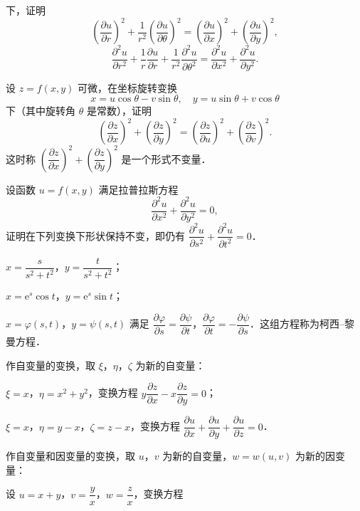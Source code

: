 \begin{xiti}
\[\]
下，证明
\[
\left(\frac{\partial u}{\partial r}\right)^{2}+\frac{1}{r^{2}}\left(\frac{\partial u}{\partial\theta}\right)^{2}=\left(\frac{\partial u}{\partial x}\right)^{2}+\left(\frac{\partial u}{\partial y}\right)^{2},
\]
\[
\frac{\partial^{2}u}{\partial r^{2}}+\frac{1}{r}\frac{\partial u}{\partial r}+\frac{1}{r^{2}}\frac{\partial^{2}u}{\partial\theta^{2}}=\frac{\partial^{2}u}{\partial x^{2}}+\frac{\partial^{2}u}{\partial y^{2}}.
\]
\item 设 $z=f(x,y)$ 可微，在坐标旋转变换
\[
x=u\cos\theta-v\sin\theta,\quad y=u\sin\theta+v\cos\theta
\]
下（其中旋转角 $\theta$ 是常数），证明
\[
\left(\frac{\partial z}{\partial x}\right)^{2}+\left(\frac{\partial z}{\partial y}\right)^{2}=\left(\frac{\partial z}{\partial u}\right)^{2}+\left(\frac{\partial z}{\partial v}\right)^{2}.
\]
这时称 $\left(\dfrac{\partial z}{\partial x}\right)^{2}+\left(\dfrac{\partial z}{\partial y}\right)^{2}$ 是一个形式不变量．
\item 设函数 $u=f(x,y)$ 满足拉普拉斯方程
\[
\frac{\partial^{2}u}{\partial x^{2}}+\frac{\partial^{2}u}{\partial y^{2}}=0,
\]
证明在下列变换下形状保持不变，即仍有 $\dfrac{\partial^{2}u}{\partial s^{2}}+\dfrac{\partial^{2}u}{\partial t^{2}}=0$．
\begin{ziti}
\item $x=\dfrac{s}{s^{2}+t^{2}}$，$y=\dfrac{t}{s^{2}+t^{2}}$；
\item $x=\mathrm{e}^{s}\cos t$，$y=\mathrm{e}^{s}\sin t$；
\item $x=\varphi(s,t)$，$y=\psi(s,t)$ 满足 $\dfrac{\partial\varphi}{\partial s}=\dfrac{\partial\psi}{\partial t}$，$\dfrac{\partial\varphi}{\partial t}=-\dfrac{\partial\psi}{\partial s}$．这组方程称为柯西--黎曼方程．
\end{ziti}
\item 作自变量的变换，取 $\xi$，$\eta$，$\zeta$ 为新的自变量：
\begin{ziti}
\item $\xi=x$，$\eta=x^{2}+y^{2}$，变换方程 $y\dfrac{\partial z}{\partial x}-x\dfrac{\partial z}{\partial y}=0$；
\item $\xi=x$，$\eta=y-x$，$\zeta=z-x$，变换方程 $\dfrac{\partial u}{\partial x}+\dfrac{\partial u}{\partial y}+\dfrac{\partial u}{\partial z}=0$．
\end{ziti}
\item 作自变量和因变量的变换，取 $u$，$v$ 为新的自变量，$w=w(u,v)$ 为新的因变量：
\begin{ziti}
\item 设 $u=x+y$，$v=\dfrac{y}{x}$，$w=\dfrac{z}{x}$，变换方程

\end{ziti}
\end{xiti}
